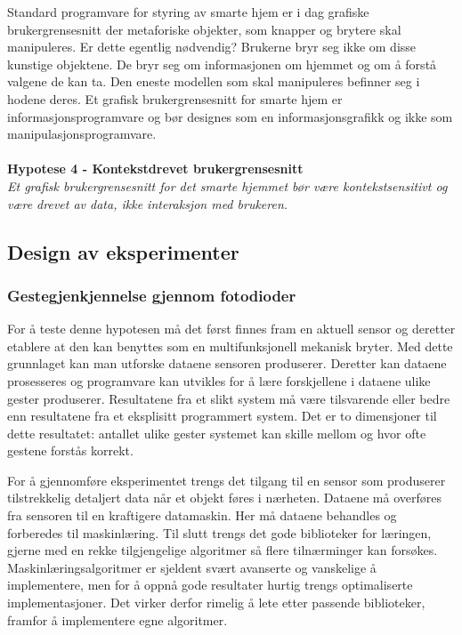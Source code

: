 Standard programvare for styring av smarte hjem er i dag grafiske brukergrensesnitt der metaforiske objekter, som knapper og brytere skal manipuleres. Er dette egentlig nødvendig? Brukerne bryr seg ikke om disse kunstige objektene. De bryr seg om informasjonen om hjemmet og om å forstå valgene de kan ta. Den eneste modellen som skal manipuleres befinner seg i hodene deres. Et grafisk brukergrensesnitt for smarte hjem er informasjonsprogramvare og bør designes som en informasjonsgrafikk og ikke som manipulasjonsprogramvare.\\\\
\textbf{Hypotese 4 - Kontekstdrevet brukergrensesnitt}\\
\emph{Et grafisk brukergrensesnitt for det smarte hjemmet bør være kontekstsensitivt og være drevet av data, ikke interaksjon med brukeren.}

\subsection{Design av eksperimenter}

\subsubsection*{Gestegjenkjennelse gjennom fotodioder}
For å teste denne hypotesen må det først finnes fram en aktuell sensor og deretter etablere at den kan benyttes som en multifunksjonell mekanisk bryter. Med dette grunnlaget kan man utforske dataene sensoren produserer. Deretter kan dataene prosesseres og programvare kan utvikles for å lære forskjellene i dataene ulike gester produserer. Resultatene fra et slikt system må være tilsvarende eller bedre enn resultatene fra et eksplisitt programmert system. Det er to dimensjoner til dette resultatet: antallet ulike gester systemet kan skille mellom og hvor ofte gestene forstås korrekt.

For å gjennomføre eksperimentet trengs det tilgang til en sensor som produserer tilstrekkelig detaljert data når et objekt føres i nærheten. Dataene må overføres fra sensoren til en kraftigere datamaskin. Her må dataene behandles og forberedes til maskinlæring. Til slutt trengs det gode biblioteker for læringen, gjerne med en rekke tilgjengelige algoritmer så flere tilnærminger kan forsøkes. Maskinlæringsalgoritmer er sjeldent svært avanserte og vanskelige å implementere, men for å oppnå gode resultater hurtig trengs optimaliserte implementasjoner. Det virker derfor rimelig å lete etter passende biblioteker, framfor å implementere egne algoritmer.

